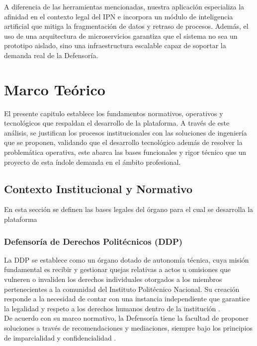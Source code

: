 \documentclass[12pt, letterpaper]{article}
\begin{document}
A diferencia de las herramientas mencionadas, nuestra aplicación especializa la afinidad en el contexto legal del IPN e incorpora un módulo de inteligencia artificial que mitiga la fragmentación de datos y retraso de procesos. Además, el uso de una arquitectura de microservicios garantiza que el sistema no sea un prototipo aislado, sino una infraestructura escalable capaz de soportar la demanda real de la Defensoría.

\section {Marco Teórico}
El presente capitulo establece los fundamentos normativos, operativos y tecnológicos que respaldan el desarrollo de la plataforma. A través de este análisis, se justifican los procesos institucionales con las soluciones de ingeniería que se proponen, validando que el desarrollo tecnológico además de resolver la problemática operativa, este abarca las bases funcionales y rigor técnico que un proyecto de esta índole demanda en el ámbito profesional.

\subsection {Contexto Institucional y Normativo}
En esta sección se definen las bases legales del órgano para el cual se desarrolla la plataforma

\subsubsection {Defensoría de Derechos Politécnicos (DDP)}
La DDP se establece como un órgano dotado de autonomía técnica, cuya misión fundamental es recibir y gestionar quejas relativas a actos u omisiones que vulneren o invaliden los derechos individuales otorgados a los miembros pertenecientes a la comunidad del Instituto Politécnico Nacional. Su creación responde a la necesidad de contar con una instancia independiente que garantice la legalidad y respeto a los derechos humanos dentro de la institución \cite{ipn_acuerdo_ddp}.
\\
De acuerdo con su marco normativo, la Defensoría tiene la facultad de proponer soluciones a través de recomendaciones y mediaciones, siempre bajo los principios de imparcialidad y confidencialidad \cite{ipn_acuerdo_ddp}.
\end{document}
